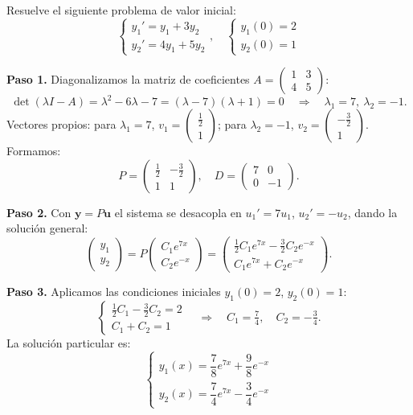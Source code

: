 \begin{example}
Resuelve el siguiente problema de valor inicial:
\[
\begin{cases}
y_1' = y_1 + 3y_2 \\
y_2' = 4y_1 + 5y_2
\end{cases}, \quad
\begin{cases}
y_1(0) = 2 \\
y_2(0) = 1
\end{cases}
\]
\begin{myproof}
\textbf{Paso 1.} Diagonalizamos la matriz de coeficientes $A=\begin{pmatrix}1&3\\4&5\end{pmatrix}$:
\[
\det(\lambda I-A) = \lambda^2-6\lambda-7 = (\lambda-7)(\lambda+1) = 0 \quad\Rightarrow\quad \lambda_1=7,\ \lambda_2=-1.
\]
Vectores propios: para $\lambda_1=7$, $v_1=\begin{pmatrix}\frac{1}{2}\\1\end{pmatrix}$; para $\lambda_2=-1$, $v_2=\begin{pmatrix}-\frac{3}{2}\\1\end{pmatrix}$. Formamos:
\[
P = \begin{pmatrix} \tfrac{1}{2} & -\tfrac{3}{2} \\ 1 & 1 \end{pmatrix}, \quad D = \begin{pmatrix} 7 & 0 \\ 0 & -1 \end{pmatrix}.
\]

\textbf{Paso 2.} Con $\mathbf{y}=P\mathbf{u}$ el sistema se desacopla en $u_1'=7u_1$, $u_2'=-u_2$, dando la solución general:
\[
\begin{pmatrix} y_1 \\ y_2 \end{pmatrix}
= P\begin{pmatrix} C_1 e^{7x} \\ C_2 e^{-x} \end{pmatrix}
= \begin{pmatrix} \tfrac{1}{2}C_1 e^{7x} - \tfrac{3}{2}C_2 e^{-x} \\ C_1 e^{7x} + C_2 e^{-x} \end{pmatrix}.
\]

\textbf{Paso 3.} Aplicamos las condiciones iniciales $y_1(0)=2$, $y_2(0)=1$:
\[
\begin{cases}
\tfrac{1}{2}C_1 - \tfrac{3}{2}C_2 = 2 \\
C_1 + C_2 = 1
\end{cases}
\quad\Rightarrow\quad C_1 = \tfrac{7}{4},\quad C_2 = -\tfrac{3}{4}.
\]
La solución particular es:
\[
\boxed{
\begin{cases}
y_1(x) = \dfrac{7}{8} e^{7x} + \dfrac{9}{8} e^{-x} \\[6pt]
y_2(x) = \dfrac{7}{4} e^{7x} - \dfrac{3}{4} e^{-x}
\end{cases}
}
\]
\end{myproof}
\end{example}

